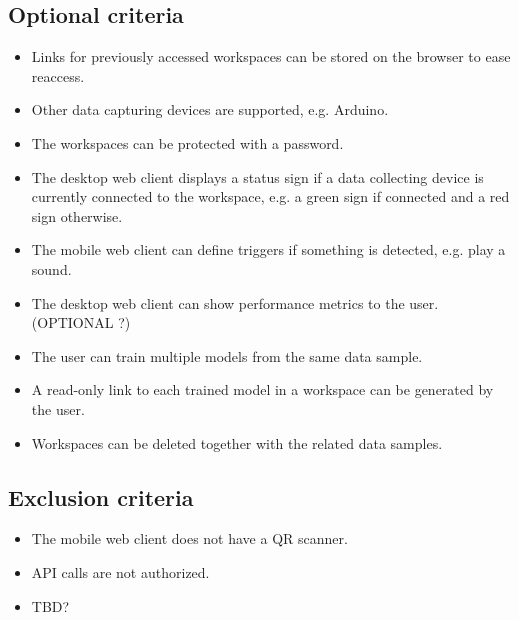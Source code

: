 \subsection{Optional criteria}
\begin{itemize}
    \item Links for previously accessed workspaces can be stored on the browser to ease reaccess.
    \item Other data capturing devices are supported, e.g. Arduino.
    \item The workspaces can be protected with a password.
    \item The desktop web client displays a status sign if a data collecting device is currently connected to the workspace, e.g. a green sign if connected and a red sign otherwise.
    \item The mobile web client can define triggers if something is detected, e.g. play a sound.
    \item The desktop web client can show performance metrics to the user. (OPTIONAL ?)
    \item The user can train multiple models from the same data sample.
    \item A read-only link to each trained model in a workspace can be generated by the user.
    \item Workspaces can be deleted together with the related data samples.
\end{itemize}

\subsection{Exclusion criteria}
\begin{itemize}
    \item The mobile web client does not have a QR scanner.
    \item API calls are not authorized.
    \item TBD?
\end{itemize}
